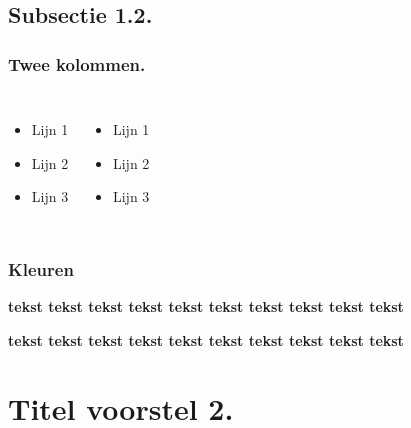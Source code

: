 \documentclass[aspectratio=169]{beamer}
\begin{document}
\subsection{Subsectie 1.2.}

\begin{frame}
    \frametitle{Twee kolommen.}

    \begin{columns}[c]
        \begin{itemize}
            \item Lijn 1
            \item Lijn 2
            \item Lijn 3
        \end{itemize}

        \begin{itemize}
            \item Lijn 1
            \item Lijn 2
            \item Lijn 3
        \end{itemize}
    \end{columns}
\end{frame}

\begin{frame}
    \frametitle{Kleuren}

    \textbf{\textcolor{hgdarkgreen}{tekst}
    \textcolor{hgpink}{tekst}
    \textcolor{hgochre}{tekst}
    \textcolor{hgorange}{tekst}
    \textcolor{hgpurple}{tekst}
    \textcolor{hgblue}{tekst}
    \textcolor{hglightgreen}{tekst}
    \textcolor{hgbrown}{tekst}
    \textcolor{hggrey}{tekst}
    \textcolor{hgyellow}{tekst}}

    \textbf{\colorbox{hgdarkgreen}{tekst}
    \colorbox{hgpink}{tekst}
    \colorbox{hgochre}{tekst}
    \colorbox{hgorange}{tekst}
    \colorbox{hgpurple}{tekst}
    \colorbox{hgblue}{tekst}
    \colorbox{hglightgreen}{tekst}
    \colorbox{hgbrown}{tekst}
    \colorbox{hggrey}{tekst}
    \colorbox{hgyellow}{tekst}}
\end{frame}

\section{Titel voorstel 2.}
\end{document}
